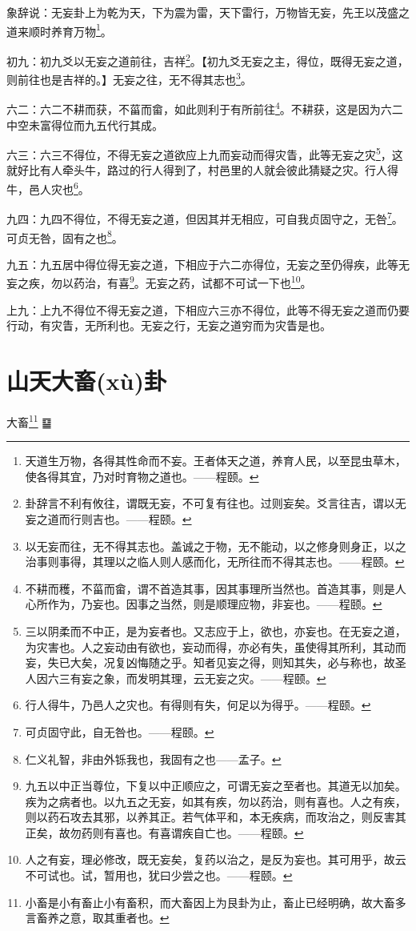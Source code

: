 \documentclass[12pt,oneside]{book}
\begin{document}
象辞说：无妄卦上为乾为天，下为震为雷，天下雷行，万物皆无妄，先王以茂盛之道来顺时养育万物\footnote{天道生万物，各得其性命而不妄。王者体天之道，养育人民，以至昆虫草木，使各得其宜，乃对时育物之道也。——程颐。}。

初九：初九爻以无妄之道前往，吉祥\footnote{卦辞言不利有攸往，谓既无妄，不可复有往也。过则妄矣。爻言往吉，谓以无妄之道而行则吉也。——程颐。}。【初九爻无妄之主，得位，既得无妄之道，则前往也是吉祥的。】无妄之往，无不得其志也\footnote{以无妄而往，无不得其志也。盖诚之于物，无不能动，以之修身则身正，以之治事则事得，其理以之临人则人感而化，无所往而不得其志也。——程颐。}。

六二：六二不耕而获，不菑而畲，如此则利于有所前往\footnote{不耕而穫，不菑而畲，谓不首造其事，因其事理所当然也。首造其事，则是人心所作为，乃妄也。因事之当然，则是顺理应物，非妄也。——程颐。}。不耕获，这是因为六二中空未富得位而九五代行其成。

六三：六三不得位，不得无妄之道欲应上九而妄动而得灾眚，此等无妄之灾\footnote{三以阴柔而不中正，是为妄者也。又志应于上，欲也，亦妄也。在无妄之道，为灾害也。人之妄动由有欲也，妄动而得，亦必有失，虽使得其所利，其动而妄，失已大矣，况复凶悔随之乎。知者见妄之得，则知其失，必与称也，故圣人因六三有妄之象，而发明其理，云无妄之灾。——程颐。}，这就好比有人牵头牛，路过的行人得到了，村邑里的人就会彼此猜疑之灾。行人得牛，邑人灾也\footnote{行人得牛，乃邑人之灾也。有得则有失，何足以为得乎。——程颐。}。

九四：九四不得位，不得无妄之道，但因其并无相应，可自我贞固守之，无咎\footnote{可贞固守此，自无咎也。——程颐。}。可贞无咎，固有之也\footnote{仁义礼智，非由外铄我也，我固有之也——孟子。}。

九五：九五居中得位得无妄之道，下相应于六二亦得位，无妄之至仍得疾，此等无妄之疾，勿以药治，有喜\footnote{九五以中正当尊位，下复以中正顺应之，可谓无妄之至者也。其道无以加矣。疾为之病者也。以九五之无妄，如其有疾，勿以药治，则有喜也。人之有疾，则以药石攻去其邪，以养其正。若气体平和，本无疾病，而攻治之，则反害其正矣，故勿药则有喜也。有喜谓疾自亡也。——程颐。}。无妄之药，试都不可试一下也\footnote{人之有妄，理必修改，既无妄矣，复药以治之，是反为妄也。其可用乎，故云不可试也。试，暂用也，犹曰少尝之也。——程颐。}。

上九：上九不得位不得无妄之道，下相应六三亦不得位，此等不得无妄之道而仍要行动，有灾眚，无所利也。无妄之行，无妄之道穷而为灾眚是也。


\chapter{山天大畜(xù)卦}
大畜\footnote{小畜是小有畜止小有畜积，而大畜因上为艮卦为止，畜止已经明确，故大畜多言畜养之意，取其重者也。} {\Large ䷙}
\end{document}
